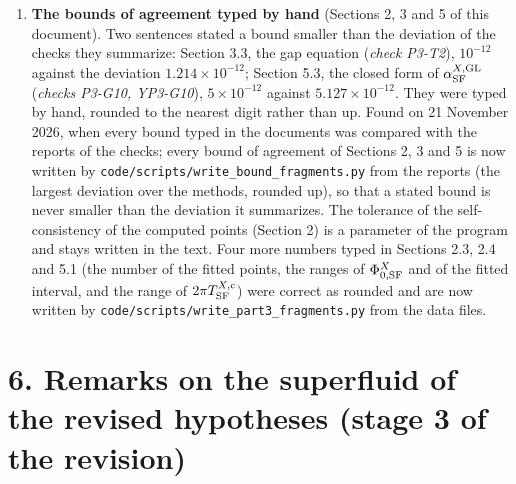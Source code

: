 \documentclass[
  10pt,
]{article}
\begin{document}
\begin{enumerate}
  the earlier work on the super-loop, and the names of the Standard
  Model, which the author had given to establish terms, symbols and
  conventions, were then read as physical identifications. Section 5.6
  now answers separately whether the superfluid is the Higgs field of
  its own group (yes, in every method, with an amplitude mode broader
  than its mass) and whether it can be the Higgs field of the Standard
  Model (no, by its quantum numbers); Table A3 and Figure A3 no longer
  contain values in GeV or values of the Standard Model; the massless
  gauge boson is the zeugon (remark R7); and the spinor field is called
  the DiracLike field.
\item
  \textbf{The bounds of agreement typed by hand} (Sections 2, 3 and 5 of
  this document). Two sentences stated a bound smaller than the
  deviation of the checks they summarize: Section 3.3, the gap equation
  (\emph{check P3-T2}), \(10^{-12}\) against the deviation
  \(1.214\times10^{-12}\); Section 5.3, the closed form of
  \(\alpha^{X,{\rm GL}}_{\rm SF}\) (\emph{checks P3-G10, YP3-G10}),
  \(5\times10^{-12}\) against \(5.127\times10^{-12}\). They were typed
  by hand, rounded to the nearest digit rather than up. Found on 21
  November 2026, when every bound typed in the documents was compared
  with the reports of the checks; every bound of agreement of Sections
  2, 3 and 5 is now written by
  \texttt{code/scripts/write\_bound\_fragments.py} from the reports (the
  largest deviation over the methods, rounded up), so that a stated
  bound is never smaller than the deviation it summarizes. The tolerance
  of the self-consistency of the computed points (Section 2) is a
  parameter of the program and stays written in the text. Four more
  numbers typed in Sections 2.3, 2.4 and 5.1 (the number of the fitted
  points, the ranges of \(\Phi^X_{0,{\rm SF}}\) and of the fitted
  interval, and the range of \(2\pi T^{X,{\rm c}}_{\rm SF}\)) were
  correct as rounded and are now written by
  \texttt{code/scripts/write\_part3\_fragments.py} from the data files.
\end{enumerate}

\hypertarget{remarks-on-the-superfluid-of-the-revised-hypotheses-stage-3-of-the-revision}{%
\section{6. Remarks on the superfluid of the revised hypotheses (stage 3
of the
revision)}\label{remarks-on-the-superfluid-of-the-revised-hypotheses-stage-3-of-the-revision}}
\end{document}
